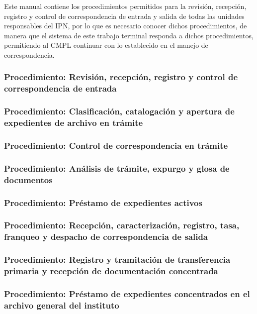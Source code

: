 	Este manual contiene los procedimientos permitidos para la revisión, recepción, registro y control de correspondencia de entrada y salida de todas las unidades responsables del IPN, por lo que es necesario conocer dichos procedimientos, de manera que el sistema de este trabajo terminal responda a dichos procedimientos, permitiendo al CMPL continuar con lo establecido en el manejo de correspondencia.\\
	
		\subsubsection{Procedimiento: Revisión, recepción, registro y control de correspondencia de entrada}
	
		\subsubsection{Procedimiento: Clasificación, catalogación y apertura de expedientes de archivo en trámite}
	
		\subsubsection{Procedimiento: Control de correspondencia en trámite}

		\subsubsection{Procedimiento: Análisis de trámite, expurgo y glosa de documentos}	

		\subsubsection{Procedimiento: Préstamo de expedientes activos}

		\subsubsection{Procedimiento: Recepción, caracterización, registro, tasa, franqueo y despacho de correspondencia de salida}

		\subsubsection{Procedimiento: Registro y tramitación de transferencia primaria y recepción de documentación concentrada}

		\subsubsection{Procedimiento: Préstamo de expedientes concentrados en el archivo general del instituto}


